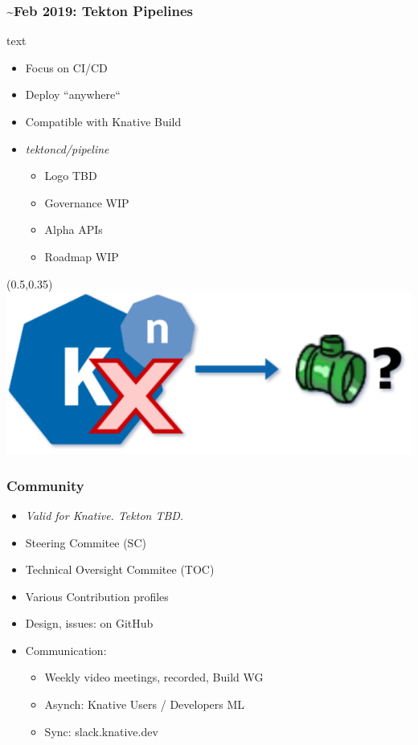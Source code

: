 \documentclass[aspectratio=169,11pt,hyperref={colorlinks=true}]{beamer}
\begin{document}
\begin{lblackrwhiteframe}
\begin{lblackrwhiteframe}
  \frametitle{\textasciitilde Feb 2019: Tekton Pipelines}
  \large
  \begin{beamercolorbox}[wd=0.3\paperwidth]{text}
    \begin{itemize}
      \item Focus on CI/CD
      \item Deploy ``anywhere``
      \item Compatible with Knative Build
    \end{itemize}
    \begin{itemize}
      \item {\em tektoncd/pipeline}
      \begin{itemize}
        \item Logo TBD
        \item Governance WIP
        \item Alpha APIs
        \item Roadmap WIP
      \end{itemize}
    \end{itemize}
  \end{beamercolorbox}%
  \begin{textblock*}{0.5\paperwidth}(0.5\paperwidth,0.35\paperheight)
    \centering
    \includegraphics[width=0.35\paperwidth]{img/tekton_not_knative.png}
  \end{textblock*}
\end{lblackrwhiteframe}

\begin{grayframe}
  \frametitle{Community}
  \begin{itemize}
    \item {\em Valid for Knative. Tekton TBD.}
    \item Steering Commitee (SC)
    \item Technical Oversight Commitee (TOC)
    \item Various Contribution profiles
    \item Design, issues: on GitHub
    \item Communication:
    \begin{itemize}
      \item Weekly video meetings, recorded, Build WG
      \item Asynch: Knative Users / Developers ML
      \item Sync: slack.knative.dev
    \end{itemize}
  \end{itemize}
\end{grayframe}


\end{lblackrwhiteframe}
\end{document}
